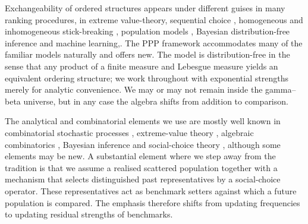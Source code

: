 \documentclass[11pt]{article}
\theoremstyle{plain}
\theoremstyle{definition}
\begin{document}
Exchangeability of ordered structures appears under different guises in many ranking procedures,
in extreme value-theory, sequential choice \cite{secretaryProblem},
homogeneous  and inhomogeneous stick-breaking
 \cite{  PitmanTran2015,   iksanov2016renewal, GnedinPitman2005, GnedinIksanovMarynych2010},
population models \cite{mailler}, Bayesian distribution-free inference
\cite{LijoiPruenster2010} and machine learning,\cite{pouxmedard2021powered}.
The PPP framework accommodates many of the familiar  models naturally and offers new. 
The model is distribution-free in the sense that any product of a finite measure and Lebesgue measure yields an equivalent ordering structure; we work throughout with exponential strengths merely for analytic convenience.  We may or may not  remain inside the gamma--beta universe, but in any case the algebra shifts from addition to comparison. 




The analytical and combinatorial elements we use are mostly well known in combinatorial stochastic processes \cite{Pitman2006}, extreme-value theory \cite{resnick1987extreme}, algebraic combinatorics  \cite{StanleyEC1}, Bayesian inference and    social-choice theory \cite{Aleskerov}, although some elements may be new. A substantial element where we step away  from the tradition is that we 
assume   a realised scattered population together with a mechanism that selects distinguished past representatives by a social-choice operator. These representatives act as benchmark setters against which a future population is compared. The emphasis therefore shifts from updating frequencies to updating residual strengths of benchmarks.














\end{document}
